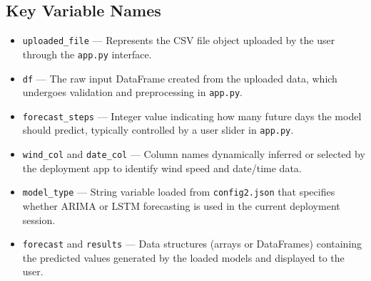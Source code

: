 \subsection{Key Variable Names }
\begin{itemize}
	\item \texttt{uploaded\_file} — Represents the CSV file object uploaded by the user through the \texttt{app.py} interface.
	\item \texttt{df} — The raw input DataFrame created from the uploaded data, which undergoes validation and preprocessing in \texttt{app.py}.
	\item \texttt{forecast\_steps} — Integer value indicating how many future days the model should predict, typically controlled by a user slider in \texttt{app.py}.
	\item \texttt{wind\_col} and \texttt{date\_col} — Column names dynamically inferred or selected by the deployment app to identify wind speed and date/time data.
	\item \texttt{model\_type} — String variable loaded from \texttt{config2.json} that specifies whether ARIMA or LSTM forecasting is used in the current deployment session.
	\item \texttt{forecast} and \texttt{results} — Data structures (arrays or DataFrames) containing the predicted values generated by the loaded models and displayed to the user.
\end{itemize}
